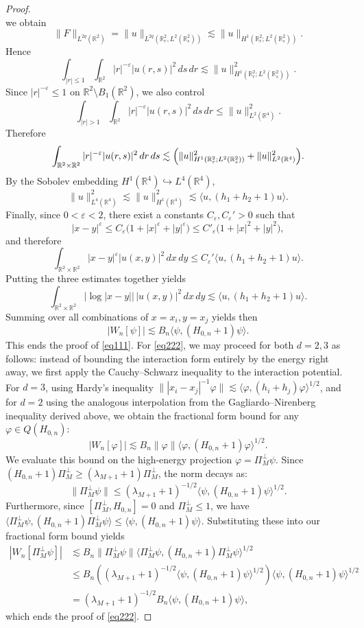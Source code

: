 \documentclass[10pt,a4paper]{amsart}
\newcommand{\R}{\mathbb{R}}
\renewcommand{\phi}{\varphi}
\begin{document}
\begin{proof}
\[\]
we obtain
\[
\|F\|_{L^{2q}(\R^2)}=\|u\|_{L^{2q}(\mathbb{R}_r^2,L^2(\mathbb{R}_s^2))}
\lesssim\|u\|_{H^1(\R^2_r;L^2(\R^2_s))}.
\]
Hence
\[
\int_{|r|\le1}\int_{\R^2}|r|^{-\varepsilon}|u(r,s)|^2\,ds\,dr
\lesssim
\|u\|_{H^1(\R^2_r;L^2(\R^2_s))}^2.
\]
Since \(|r|^{-\varepsilon}\le1\) on \(\R^2\setminus B_1(\mathbb{R}^2)\), we also control
\[
\int_{|r|>1}\int_{\R^2}|r|^{-\varepsilon}|u(r,s)|^2\,ds\,dr
\le
\|u\|_{L^2(\R^4)}^2.
\]
Therefore
\[
\int_{\R^2\times\R^2}|r|^{-\varepsilon}|u(r,s)|^2\,dr\,ds
\lesssim
\Bigl(\|u\|_{H^1(\R^2_r;L^2(\R^2_s))}^2+\|u\|_{L^2(\R^4)}^2\Bigr).
\]
By the Sobolev embedding \(H^1(\R^4)\hookrightarrow L^4(\R^4)\),
\[
\|u\|_{L^4(\R^4)}^2
\lesssim\|u\|_{H^1(\R^4)}^2
\lesssim
\langle u,(h_1+h_2+1)u\rangle.
\]
Finally, since \(0<\varepsilon<2\), there exist a constants $C_\varepsilon,C_\varepsilon'>0$ such that
\[
|x-y|^\varepsilon\le C_{\varepsilon}\bigl(1+|x|^\varepsilon+|y|^\varepsilon\bigr)
\le C'_{\varepsilon}\bigl(1+|x|^2+|y|^2\bigr),
\]
and therefore
\[
\int_{\R^2\times\R^2}|x-y|^\varepsilon |u(x,y)|^2\,dx\,dy
\le
C_\varepsilon'\langle u,(h_1+h_2+1)u\rangle.
\]
Putting the three estimates together yields
\[
\int_{\R^2\times\R^2}|\log|x-y||\,|u(x,y)|^2\,dx\,dy
\lesssim
\langle u,(h_1+h_2+1)u\rangle.
\]
Summing over all combinations of $x=x_i,y=x_j$ yields then 
\[
|W_n[\psi]|\lesssim B_n\langle\psi,(H_{0,n}+1)\psi\rangle.
\]
This ends the proof of \eqref{eq111}. For \eqref{eq222}, we may proceed for both $d=2,3$ as follows:
instead of bounding the interaction form entirely by the energy right away, we first apply the Cauchy--Schwarz inequality to the interaction potential. For $d=3$, using Hardy's inequality $\| |x_i-x_j|^{-1}\phi \| \lesssim \langle \phi, (h_i+h_j)\phi \rangle^{1/2}$, and for $d=2$ using the analogous interpolation from the Gagliardo--Nirenberg inequality derived above, we obtain the fractional form bound for any $\phi \in Q(H_{0,n})$:
\[
|W_n[\phi]| \lesssim B_n \|\phi\| \langle \phi, (H_{0,n}+1)\phi \rangle^{1/2}.
\]
We evaluate this bound on the high-energy projection $\phi = \Pi_M^\perp\psi$. Since $(H_{0,n}+1)\Pi_M^\perp\ge(\lambda_{M+1}+1)\Pi_M^\perp$, the norm decays as:
\[ 
\|\Pi_M^\perp\psi\| \le (\lambda_{M+1}+1)^{-1/2}\langle\psi,(H_{0,n}+1)\psi\rangle^{1/2}.
\]
Furthermore, since $[\Pi_M^\perp,H_{0,n}]=0$ and $\Pi_M^\perp \le 1$, we have $\langle \Pi_M^\perp\psi, (H_{0,n}+1)\Pi_M^\perp\psi\rangle \le \langle \psi, (H_{0,n}+1)\psi\rangle$. Substituting these into our fractional form bound yields
\begin{align}
|W_n[\Pi_M^\perp\psi]| &\lesssim B_n \|\Pi_M^\perp\psi\| \langle \Pi_M^\perp\psi, (H_{0,n}+1)\Pi_M^\perp\psi \rangle^{1/2}\nonumber\\
&\le B_n \left( (\lambda_{M+1}+1)^{-1/2} \langle \psi, (H_{0,n}+1)\psi \rangle^{1/2} \right) \langle \psi, (H_{0,n}+1)\psi \rangle^{1/2}\nonumber\\
&= (\lambda_{M+1}+1)^{-1/2}B_n\langle \psi,(H_{0,n}+1)\psi\rangle,\label{eq2222}
\end{align}
which ends the proof of \eqref{eq222}.



\end{proof}
\end{document}
